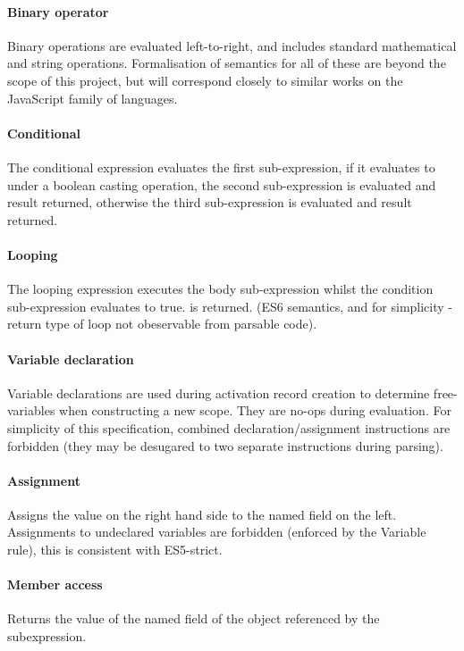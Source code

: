 \documentclass[a4paper]{article}
\begin{document}
\paragraph{Binary operator} Binary operations are evaluated left-to-right, and includes standard
mathematical and string operations. Formalisation of semantics for all of these
are beyond the scope of this project, but will correspond closely to similar
works on the JavaScript family of languages.

\paragraph{Conditional} The conditional expression evaluates the first sub-expression, if it evaluates
to  under a boolean casting operation, the second sub-expression is
evaluated and result returned, otherwise the third sub-expression is evaluated
and result returned.

\paragraph{Looping} The looping expression executes the body sub-expression
whilst the condition sub-expression evaluates to true. \und is returned. (ES6
semantics, and for simplicity - return type of loop not obeservable from
parsable code).

\paragraph{Variable declaration} Variable declarations are used during activation
record creation to determine free-variables when constructing a new scope. They
are no-ops during evaluation. For simplicity of this specification, combined
declaration/assignment instructions are forbidden (they may be desugared to two
separate instructions during parsing).

\paragraph{Assignment} Assigns the value on the right hand side to the named
field on the left. Assignments to undeclared variables are forbidden (enforced
by the Variable rule), this is consistent with ES5-strict.

\paragraph{Member access} Returns the value of the named field of the object referenced by
the subexpression.
\end{document}
